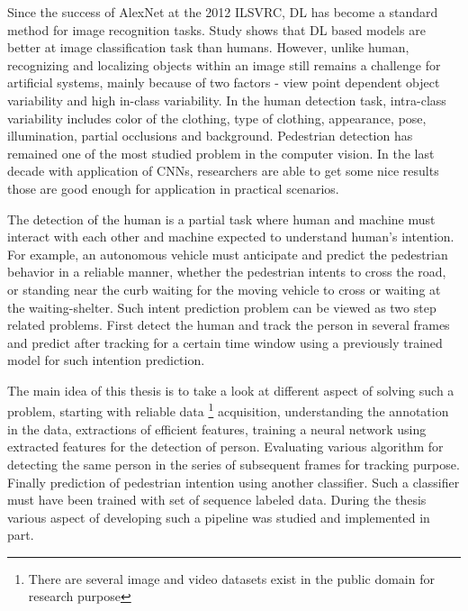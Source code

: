\newpara Since the success of AlexNet at the 2012 ILSVRC, DL has become a standard method for image recognition tasks. Study shows that DL based models are better at image classification task than humans. However, unlike human, recognizing and localizing objects within an image still remains a challenge for artificial 
systems, mainly because of two factors - view point dependent object variability and
high in-class variability. In the human detection task, intra-class variability includes
color of the clothing, type of clothing, appearance, pose, illumination, partial occlusions
and background. Pedestrian detection has remained one of  the most studied problem in the computer vision.
In the last decade with application of CNNs, researchers are able to get some nice results 
those are good enough for application in practical scenarios.

\newpara The detection of the human is a partial task where human and machine must interact 
with each other and machine expected to understand human's intention. For example, 
an autonomous vehicle must anticipate and predict the pedestrian behavior in a reliable manner, whether 
the pedestrian intents to cross the road, or standing near the curb waiting for the moving vehicle to cross or waiting at the waiting-shelter.
Such intent prediction problem can be viewed as two step related problems. First detect the 
human and track the person in several frames and predict after tracking for a certain time window using a previously trained model for such intention prediction.

\newpara The main idea of this thesis is to take a look at different aspect of solving such a problem, 
starting with reliable data \footnote{There are several image and video datasets exist in the 
public domain for research purpose} acquisition, understanding the annotation in the data, extractions of efficient features, training a neural network using extracted features for the detection of person. Evaluating various algorithm for detecting the same person in the series of subsequent frames for tracking purpose. Finally prediction of pedestrian intention using another classifier. Such a classifier must have been trained with set of sequence labeled data. During the thesis various aspect of developing such a pipeline was studied and implemented in part.

